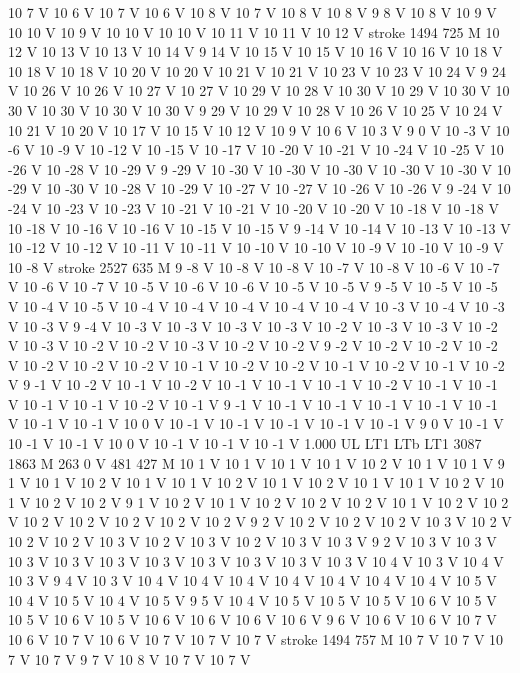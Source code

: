 {{10 7 V
10 6 V
10 7 V
10 6 V
10 8 V
10 7 V
10 8 V
10 8 V
9 8 V
10 8 V
10 9 V
10 10 V
10 9 V
10 10 V
10 10 V
10 11 V
10 11 V
10 12 V
stroke
1494 725 M
10 12 V
10 13 V
10 13 V
10 14 V
9 14 V
10 15 V
10 15 V
10 16 V
10 16 V
10 18 V
10 18 V
10 18 V
10 20 V
10 20 V
10 21 V
10 21 V
10 23 V
10 23 V
10 24 V
9 24 V
10 26 V
10 26 V
10 27 V
10 27 V
10 29 V
10 28 V
10 30 V
10 29 V
10 30 V
10 30 V
10 30 V
10 30 V
10 30 V
9 29 V
10 29 V
10 28 V
10 26 V
10 25 V
10 24 V
10 21 V
10 20 V
10 17 V
10 15 V
10 12 V
10 9 V
10 6 V
10 3 V
9 0 V
10 -3 V
10 -6 V
10 -9 V
10 -12 V
10 -15 V
10 -17 V
10 -20 V
10 -21 V
10 -24 V
10 -25 V
10 -26 V
10 -28 V
10 -29 V
9 -29 V
10 -30 V
10 -30 V
10 -30 V
10 -30 V
10 -30 V
10 -29 V
10 -30 V
10 -28 V
10 -29 V
10 -27 V
10 -27 V
10 -26 V
10 -26 V
9 -24 V
10 -24 V
10 -23 V
10 -23 V
10 -21 V
10 -21 V
10 -20 V
10 -20 V
10 -18 V
10 -18 V
10 -18 V
10 -16 V
10 -16 V
10 -15 V
10 -15 V
9 -14 V
10 -14 V
10 -13 V
10 -13 V
10 -12 V
10 -12 V
10 -11 V
10 -11 V
10 -10 V
10 -10 V
10 -9 V
10 -10 V
10 -9 V
10 -8 V
stroke
2527 635 M
9 -8 V
10 -8 V
10 -8 V
10 -7 V
10 -8 V
10 -6 V
10 -7 V
10 -6 V
10 -7 V
10 -5 V
10 -6 V
10 -6 V
10 -5 V
10 -5 V
9 -5 V
10 -5 V
10 -5 V
10 -4 V
10 -5 V
10 -4 V
10 -4 V
10 -4 V
10 -4 V
10 -4 V
10 -3 V
10 -4 V
10 -3 V
10 -3 V
9 -4 V
10 -3 V
10 -3 V
10 -3 V
10 -3 V
10 -2 V
10 -3 V
10 -3 V
10 -2 V
10 -3 V
10 -2 V
10 -2 V
10 -3 V
10 -2 V
10 -2 V
9 -2 V
10 -2 V
10 -2 V
10 -2 V
10 -2 V
10 -2 V
10 -2 V
10 -1 V
10 -2 V
10 -2 V
10 -1 V
10 -2 V
10 -1 V
10 -2 V
9 -1 V
10 -2 V
10 -1 V
10 -2 V
10 -1 V
10 -1 V
10 -1 V
10 -2 V
10 -1 V
10 -1 V
10 -1 V
10 -1 V
10 -2 V
10 -1 V
9 -1 V
10 -1 V
10 -1 V
10 -1 V
10 -1 V
10 -1 V
10 -1 V
10 -1 V
10 0 V
10 -1 V
10 -1 V
10 -1 V
10 -1 V
10 -1 V
9 0 V
10 -1 V
10 -1 V
10 -1 V
10 0 V
10 -1 V
10 -1 V
10 -1 V
1.000 UL
LT1
LTb
LT1
3087 1863 M
263 0 V
481 427 M
10 1 V
10 1 V
10 1 V
10 1 V
10 2 V
10 1 V
10 1 V
9 1 V
10 1 V
10 2 V
10 1 V
10 1 V
10 2 V
10 1 V
10 2 V
10 1 V
10 1 V
10 2 V
10 1 V
10 2 V
10 2 V
9 1 V
10 2 V
10 1 V
10 2 V
10 2 V
10 2 V
10 1 V
10 2 V
10 2 V
10 2 V
10 2 V
10 2 V
10 2 V
10 2 V
9 2 V
10 2 V
10 2 V
10 2 V
10 3 V
10 2 V
10 2 V
10 2 V
10 3 V
10 2 V
10 3 V
10 2 V
10 3 V
10 3 V
9 2 V
10 3 V
10 3 V
10 3 V
10 3 V
10 3 V
10 3 V
10 3 V
10 3 V
10 3 V
10 3 V
10 4 V
10 3 V
10 4 V
10 3 V
9 4 V
10 3 V
10 4 V
10 4 V
10 4 V
10 4 V
10 4 V
10 4 V
10 4 V
10 5 V
10 4 V
10 5 V
10 4 V
10 5 V
9 5 V
10 4 V
10 5 V
10 5 V
10 5 V
10 6 V
10 5 V
10 5 V
10 6 V
10 5 V
10 6 V
10 6 V
10 6 V
10 6 V
9 6 V
10 6 V
10 6 V
10 7 V
10 6 V
10 7 V
10 6 V
10 7 V
10 7 V
10 7 V
stroke
1494 757 M
10 7 V
10 7 V
10 7 V
10 7 V
9 7 V
10 8 V
10 7 V
10 7 V
}}
